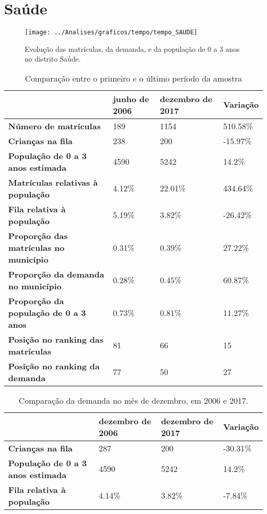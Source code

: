 \section{Saúde}
\begin{figure}[H]
\centering
\texttt{[image: ../Analises/graficos/tempo/tempo\_SAUDE]}
\caption{Evolução das matrículas, da demanda, e da população de 0 a 3 anos no distrito Saúde.}
\end{figure}
\begin{table}[H]
\begin{tabular}{|l|l|l|l|}
\hline
\textbf{}                                      & \textbf{junho de 2006}       & \textbf{dezembro de 2017}    & \textbf{Variação} \\ \hline
\textbf{Número de matrículas}                  & 189 & 1154 & 510.58\% \\ \hline
\textbf{Crianças na fila}                      & 238 & 200 & -15.97\% \\ \hline
\textbf{População de 0 a 3 anos estimada}      & 4590 & 5242 & 14.2\% \\ \hline
\textbf{Matrículas relativas à população}      & 4.12\% & 22.01\% & 434.64\% \\ \hline
\textbf{Fila relativa à população}             & 5.19\% & 3.82\% & -26.42\% \\ \hline
\textbf{Proporção das matrículas no município} & 0.31\% & 0.39\% & 27.22\% \\ \hline
\textbf{Proporção da demanda no município}     & 0.28\% & 0.45\% & 60.87\% \\ \hline
\textbf{Proporção da população de 0 a 3 anos}  & 0.73\% & 0.81\% & 11.27\% \\ \hline
\textbf{Posição no ranking das matrículas}     & 81 & 66 & 15 \\ \hline
\textbf{Posição no ranking da demanda}         & 77 & 50 & 27 \\ \hline
\end{tabular}
\caption{Comparação entre o primeiro e o último período da amostra}
\end{table}
\begin{table}[H]
\begin{tabular}{|l|l|l|l|}
\hline
\textbf{}                                 & \textbf{dezembro de 2006} & \textbf{dezembro de 2017} & \textbf{Variação} \\ \hline
\textbf{Crianças na fila}                      & 287 & 200 & -30.31\% \\ \hline
\textbf{População de 0 a 3 anos estimada}      & 4590 & 5242 & 14.2\% \\ \hline
\textbf{Fila relativa à população}             & 4.14\% & 3.82\% & -7.84\% \\ \hline
\end{tabular}
\caption{Comparação da demanda no mês de dezembro, em 2006 e 2017.}
\end{table}
